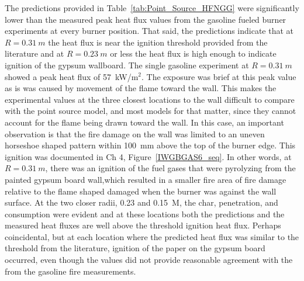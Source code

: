 \documentclass[twoside]{uocthesis}
\begin{document}
{The predictions provided in Table~\ref{tab:Point_Source_HFNGG} were significantly lower than the measured peak heat flux values from the gasoline fueled burner experiments at every burner position.  That said, the predictions indicate that at $R=0.31~m$  the heat flux is near the ignition threshold provided from the literature and at $R=0.23~m$ or less the heat flux is high enough to indicate ignition of the gypsum wallboard.  The single gasoline experiment at $R=0.31~m$ showed a peak heat flux of 57~kW/m$^2$.  The exposure was brief at this peak value as is was caused by movement of the flame toward the wall.  This makes the experimental values at the three closest locations to the wall difficult to compare with the point source model, and most models for that matter, since they cannot account for the flame being drawn toward the wall.  In this case, an important observation is that the fire damage on the wall was limited to an uneven horseshoe shaped pattern within 100~mm above the top of the burner edge.  This ignition was documented in Ch 4, Figure~\ref{IWGBGAS6_seq}. In other words, at $R=0.31~m$, there was an ignition of the fuel gases that were pyrolyzing from the painted gypsum board wall,which resulted in a smaller fire area of fire damage relative to the flame shaped damaged when the burner was against the wall surface.  At the two closer radii, 0.23 and 0.15~M, the char, penetration, and consumption were evident and at these locations both the predictions and the measured heat fluxes are well above the threshold ignition heat flux.  Perhaps coincidental, but at each location where the predicted heat flux was similar to the threshold from the literature, ignition of the paper on the gypsum board occurred, even though the values did not provide reasonable agreement with the from the gasoline fire measurements.                          

}
\end{document}
